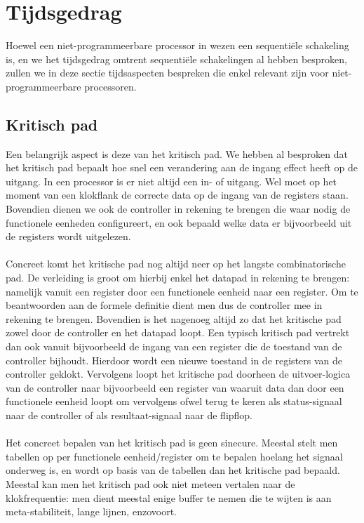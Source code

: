 \section{Tijdsgedrag}
\label{s:timeFSMD}
Hoewel een niet-programmeerbare processor in wezen een sequenti\"ele schakeling is, en we het tijdsgedrag omtrent sequenti\"ele schakelingen al hebben besproken, zullen we in deze sectie tijdsaspecten bespreken die enkel relevant zijn voor niet-programmeerbare processoren.
\subsection{Kritisch pad}
Een belangrijk aspect is deze van het kritisch pad. We hebben al besproken dat het kritisch pad bepaalt hoe snel een verandering aan de ingang effect heeft op de uitgang. In een processor is er niet altijd een in- of uitgang. Wel moet op het moment van een klokflank de correcte data op de ingang van de registers staan. Bovendien dienen we ook de controller in rekening te brengen die waar nodig de functionele eenheden configureert, en ook bepaald welke data er bijvoorbeeld uit de registers wordt uitgelezen.
\paragraph{}
Concreet komt het kritische pad nog altijd neer op het langste combinatorische pad. De verleiding is groot om hierbij enkel het datapad in rekening te brengen: namelijk vanuit een register door een functionele eenheid naar een register. Om te beantwoorden aan de formele definitie dient men dus de controller mee in rekening te brengen. Bovendien is het nagenoeg altijd zo dat het kritische pad zowel door de controller en het datapad loopt. Een typisch kritisch pad vertrekt dan ook vanuit bijvoorbeeld de ingang van een register die de toestand van de controller bijhoudt. Hierdoor wordt een nieuwe toestand in de registers van de controller geklokt. Vervolgens loopt het kritische pad doorheen de uitvoer-logica van de controller naar bijvoorbeeld een register van waaruit data dan door een functionele eenheid loopt om vervolgens ofwel terug te keren als status-signaal naar de controller of als resultaat-signaal naar de flipflop.
\paragraph{}
Het concreet bepalen van het kritisch pad is geen sinecure. Meestal stelt men tabellen op per functionele eenheid/register om te bepalen hoelang het signaal onderweg is, en wordt op basis van de tabellen dan het kritische pad bepaald. Meestal kan men het kritisch pad ook niet meteen vertalen naar de klokfrequentie: men dient meestal enige buffer te nemen die te wijten is aan meta-stabiliteit, lange lijnen, enzovoort.
